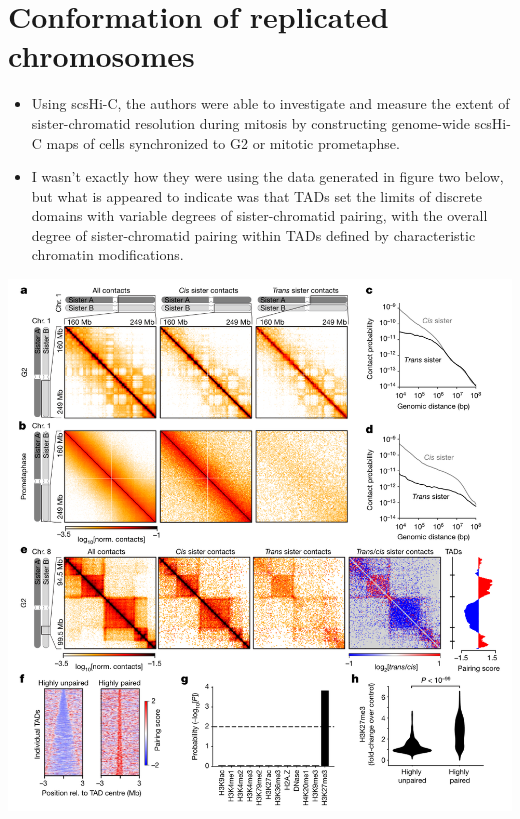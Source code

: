 \documentclass[plain,basic]{inVerba-notes}
\begin{document}
\section{Conformation of replicated chromosomes}
\begin{itemize}
    \item Using scsHi-C, the authors were able to investigate and measure the extent of sister-chromatid resolution during mitosis by constructing genome-wide scsHi-C maps of cells synchronized to G2 or mitotic prometaphse.
    \item I wasn't exactly how they were using the data generated in figure two below, but what is appeared to indicate was that TADs set the limits of discrete domains with variable degrees of sister-chromatid pairing, with the overall degree of sister-chromatid pairing within TADs defined by characteristic chromatin modifications.
\end{itemize}
\begin{center}
    \includegraphics[scale=0.44]{images/8-2.png}
\end{center}

\newpage
\end{document}
